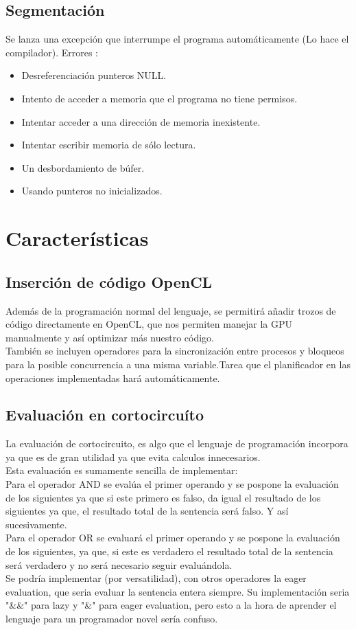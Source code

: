 \documentclass[12pt,a4paper]{article}
\begin{document}
\subsection{Segmentación}
Se lanza una excepción que interrumpe el programa automáticamente (Lo hace el
compilador).
Errores :
\begin{itemize}
\item Desreferenciación punteros NULL.
\item Intento de acceder a memoria que el programa no tiene permisos.
\item Intentar acceder a una dirección de memoria inexistente.
\item Intentar escribir memoria de sólo lectura.
\item Un desbordamiento de búfer. 
\item Usando punteros no inicializados.
\end{itemize}
\section{Características}
\subsection{Inserción de código OpenCL}
Además de la programación normal del lenguaje, se permitirá añadir trozos de
código directamente en OpenCL, que nos permiten manejar la GPU manualmente y así
optimizar más nuestro código. 
 \\ También se incluyen operadores para la sincronización entre procesos y
 bloqueos para la posible concurrencia a una misma variable.Tarea que el
 planificador en las operaciones implementadas hará automáticamente.
 \subsection{Evaluación en cortocircuíto}
 La evaluación de cortocircuito, es algo que el lenguaje de programación incorpora ya que es de gran utilidad ya que evita calculos innecesarios.\\
 Esta evaluación es sumamente sencilla de implementar:\\
 Para el operador AND se evalúa el primer operando y se pospone la evaluación de los siguientes ya que si este primero es falso, da igual el resultado de los siguientes ya que, el resultado total de la sentencia será falso. Y así sucesivamente.\\
 Para el operador OR se evaluará el primer operando y se pospone la evaluación de los siguientes, ya que, si este es verdadero el resultado total de la sentencia será verdadero y no será necesario seguir evaluándola.
 \\ Se podría implementar (por versatilidad), con otros operadores la eager evaluation, que seria evaluar la sentencia entera siempre. Su implementación seria "\&\&" para lazy y "\&" para eager evaluation, pero esto a la hora de aprender el lenguaje para un programador novel sería confuso.
\end{document}
